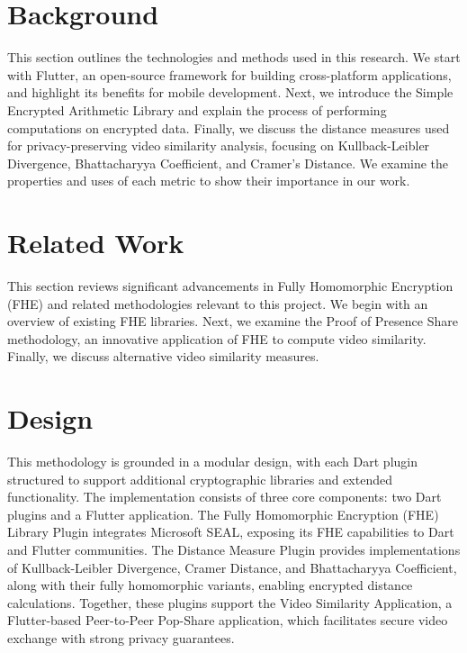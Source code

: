 \documentclass [11pt, proquest] {uwthesis}[2020/02/24]
\begin{document}




 
\chapter{Background}

This section outlines the technologies and methods used in this research. We start with Flutter, an open-source framework for building cross-platform applications, and highlight its benefits for mobile development. Next, we introduce the Simple Encrypted Arithmetic Library and explain the process of performing computations on encrypted data. Finally, we discuss the distance measures used for privacy-preserving video similarity analysis, focusing on Kullback-Leibler Divergence, Bhattacharyya Coefficient, and Cramer’s Distance. We examine the properties and uses of each metric to show their importance in our work.





 
\chapter{Related Work}

This section reviews significant advancements in Fully Homomorphic Encryption (FHE) and related methodologies relevant to this project. We begin with an overview of existing FHE libraries. Next, we examine the Proof of Presence Share methodology, an innovative application of FHE to compute video similarity. Finally, we discuss alternative video similarity measures.





 
\chapter{Design}

This methodology is grounded in a modular design, with each Dart plugin structured to support additional cryptographic libraries and extended functionality. The implementation consists of three core components: two Dart plugins and a Flutter application. The Fully Homomorphic Encryption (FHE) Library Plugin integrates Microsoft SEAL, exposing its FHE capabilities to Dart and Flutter communities. The Distance Measure Plugin provides implementations of Kullback-Leibler Divergence, Cramer Distance, and Bhattacharyya Coefficient, along with their fully homomorphic variants, enabling encrypted distance calculations. Together, these plugins support the Video Similarity Application, a Flutter-based Peer-to-Peer Pop-Share application, which facilitates secure video exchange with strong privacy guarantees.
\end{document}
